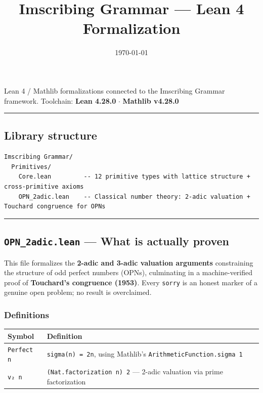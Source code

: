 \documentclass[12pt,a4paper]{article}
\begin{document}
\title{Imscribing Grammar --- Lean 4 Formalization}
\date{\today}

\maketitle

Lean 4 / Mathlib formalizations connected to the Imscribing Grammar framework.
Toolchain: \textbf{Lean 4.28.0} $\cdot$ \textbf{Mathlib v4.28.0}

\begin{center}
\rule{0.5\textwidth}{0.4pt}
\end{center}

\subsection{Library structure}

\begin{lstlisting}
Imscribing Grammar/
  Primitives/
    Core.lean         -- 12 primitive types with lattice structure + cross-primitive axioms
    OPN_2adic.lean    -- Classical number theory: 2-adic valuation + Touchard congruence for OPNs
\end{lstlisting}

\begin{center}
\rule{0.5\textwidth}{0.4pt}
\end{center}

\subsection{\texttt{OPN\_2adic.lean} --- What is actually proven}

This file formalizes the \textbf{2-adic and 3-adic valuation arguments} constraining the structure of
odd perfect numbers (OPNs), culminating in a machine-verified proof of \textbf{Touchard's congruence
(1953)}. Every \texttt{sorry} is an honest marker of a genuine open problem; no result is overclaimed.

\subsubsection{Definitions}

\begin{table}[htbp]
\centering
\small
{}
\begin{tabularx}{\textwidth}{>{\centering\arraybackslash}X >{\centering\arraybackslash}X}
\toprule
\rowcolor{gray!25}\textbf{Symbol} & \textbf{Definition} \\
\midrule
\rowcolors{1}{white}{gray!10}
\texttt{Perfect n} & \texttt{sigma(n) = 2n}, using Mathlib's \texttt{ArithmeticFunction.sigma 1} \\
\texttt{v₂ n} & \texttt{(Nat.factorization n) 2} --- 2-adic valuation via prime factorization \\
\bottomrule
\end{tabularx}
\end{table}
\end{document}
